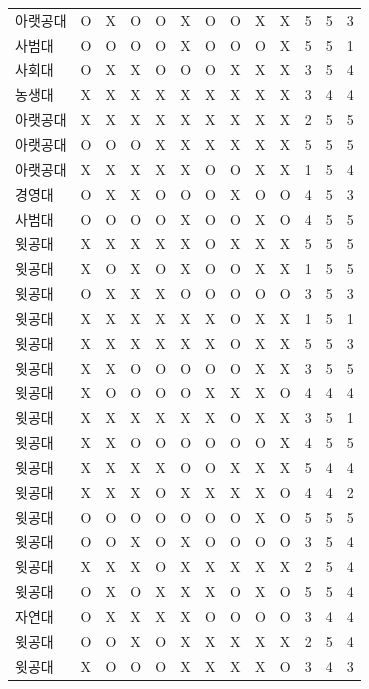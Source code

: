 \documentclass[11pt,a4paper]{article}
\begin{document}
\begin{center}
\begin{supertabular}{ | p{2cm} | x{0.5cm} | x{0.5cm} | x{0.5cm} | x{0.5cm} | x{0.5cm} | x{0.5cm} | x{0.5cm} | x{0.5cm} | x{0.5cm} | x{0.5cm} | x{0.5cm} | x{0.5cm} | }
아랫공대 & O & X & O & O & X & O & O & X & X & 5 & 5 & 3 \\
사범대 & O & O & O & O & X & O & O & O & X & 5 & 5 & 1 \\
사회대 & O & X & X & O & O & O & X & X & X & 3 & 5 & 4 \\
농생대 & X & X & X & X & X & X & X & X & X & 3 & 4 & 4 \\
아랫공대 & X & X & X & X & X & X & X & X & X & 2 & 5 & 5 \\
아랫공대 & O & O & O & X & X & X & X & X & X & 5 & 5 & 5 \\
아랫공대 & X & X & X & X & X & O & O & X & X & 1 & 5 & 4 \\
경영대 & O & X & X & O & O & O & X & O & O & 4 & 5 & 3 \\
사범대 & O & O & O & O & X & O & O & X & O & 4 & 5 & 5 \\
윗공대 & X & X & X & X & X & O & X & X & X & 5 & 5 & 5 \\
윗공대 & X & O & X & O & X & O & O & X & X & 1 & 5 & 5 \\
윗공대 & O & X & X & X & O & O & O & O & O & 3 & 5 & 3 \\
윗공대 & X & X & X & X & X & X & O & X & X & 1 & 5 & 1 \\
윗공대 & X & X & X & X & X & X & O & X & X & 5 & 5 & 3 \\
윗공대 & X & X & O & O & O & O & O & X & X & 3 & 5 & 5 \\
윗공대 & X & O & O & O & O & X & X & X & O & 4 & 4 & 4 \\
윗공대 & X & X & X & X & X & X & O & X & X & 3 & 5 & 1 \\
윗공대 & X & X & O & O & O & O & O & O & X & 4 & 5 & 5 \\
윗공대 & X & X & X & X & O & O & X & X & X & 5 & 4 & 4 \\
윗공대 & X & X & X & O & X & X & X & X & O & 4 & 4 & 2 \\
윗공대 & O & O & O & O & O & O & O & X & O & 5 & 5 & 5 \\
윗공대 & O & O & X & O & X & O & O & O & O & 3 & 5 & 4 \\
윗공대 & X & X & X & O & X & X & X & X & X & 2 & 5 & 4 \\
윗공대 & O & X & O & X & X & X & O & X & O & 5 & 5 & 4 \\
자연대 & O & X & X & X & X & O & O & O & O & 3 & 4 & 4 \\
윗공대 & O & O & X & O & X & X & X & X & X & 2 & 5 & 4 \\
윗공대 & X & O & O & O & X & X & X & X & O & 3 & 4 & 3 \\

\end{supertabular}
\end{center}
\end{document}
